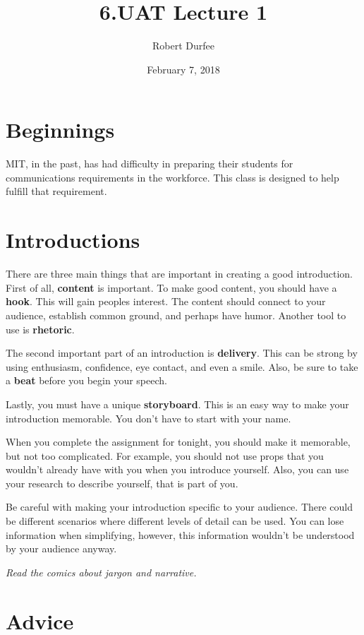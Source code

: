 \documentclass{article}
\title{ 6.UAT Lecture 1 }
\author{ Robert Durfee }
\date{ February 7, 2018 }
\begin{document}
\maketitle

\section{ Beginnings }

MIT, in the past, has had difficulty in preparing their students for
communications requirements in the workforce. This class is designed to help
fulfill that requirement.

\section{ Introductions }

There are three main things that are important in creating a good introduction.
First of all, \textbf{content} is important. To make good content, you should
have a \textbf{hook}. This will gain peoples interest. The content should
connect to your audience, establish common ground, and perhaps have humor.
Another tool to use is \textbf{rhetoric}.

The second important part of an introduction is \textbf{delivery}. This can be
strong by using enthusiasm, confidence, eye contact, and even a smile. Also, be
sure to take a \textbf{beat} before you begin your speech.

Lastly, you must have a unique \textbf{storyboard}. This is an easy way to make
your introduction memorable. You don't have to start with your name.

When you complete the assignment for tonight, you should make it memorable, but
not too complicated. For example, you should not use props that you wouldn't
already have with you when you introduce yourself. Also, you can use your
research to describe yourself, that is part of you.

Be careful with making your introduction specific to your audience. There could
be different scenarios where different levels of detail can be used. You can
lose information when simplifying, however, this information wouldn't be
understood by your audience anyway.

\bigbreak

\textit{Read the comics about jargon and narrative.}

\section{ Advice }
\end{document}
